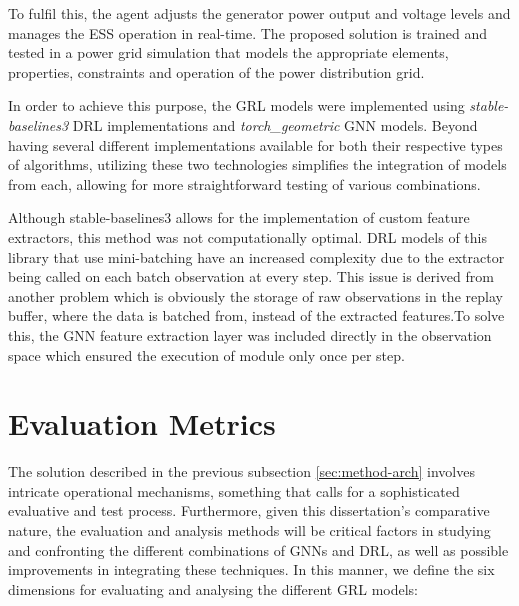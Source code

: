 To fulfil this, the agent adjusts the generator power output and voltage levels and manages the \ac{ESS} operation in real-time. The proposed solution is trained and tested in a power grid simulation that models the appropriate elements, properties, constraints and operation of the power distribution grid. \par
In order to achieve this purpose, the \ac{GRL} models were implemented using \textit{stable-baselines3} \ac{DRL} implementations and \textit{torch\_geometric} \ac{GNN} models. Beyond having several different implementations available for both their respective types of algorithms, utilizing these two technologies simplifies the integration of models from each, allowing for more straightforward testing of various combinations. \par
Although stable-baselines3 allows for the implementation of custom feature extractors, this method was not computationally optimal. \ac{DRL} models of this library that use mini-batching have an increased complexity due to the extractor being called on each batch observation at every step. This issue is derived from another problem which is obviously the storage of raw observations in the replay buffer, where the data is batched from, instead of the extracted features.To solve this, the \ac{GNN} feature extraction layer was included directly in the observation space which ensured the execution of module only once per step. \par



\section{Evaluation Metrics} \label{sec:method-eval}


The solution described in the previous subsection \ref{sec:method-arch} involves intricate operational mechanisms, something that calls for a sophisticated evaluative and test process. Furthermore, given this dissertation's comparative nature, the evaluation and analysis methods will be critical factors in studying and confronting the different combinations of \acp{GNN} and \ac{DRL}, as well as possible improvements in integrating these techniques. In this manner, we define the six dimensions for evaluating and analysing the different \ac{GRL} models:

